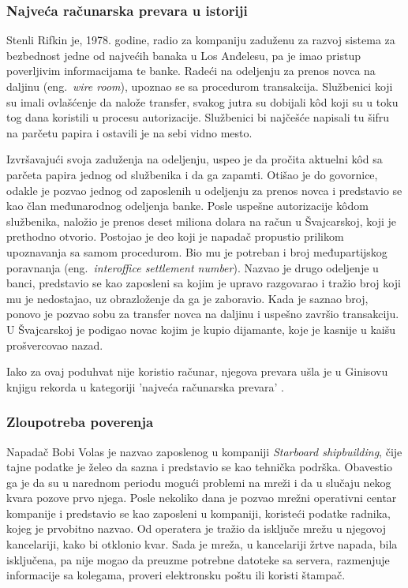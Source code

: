 \documentclass[a4paper]{article}
\begin{document}
\subsubsection{Najveća računarska prevara u istoriji}
\label{hack_za_ginisa}

Stenli Rifkin je, 1978. godine, radio za kompaniju 
zaduženu za razvoj sistema za bezbednost jedne od 
najvećih banaka u Los Anđelesu, pa je imao pristup 
poverljivim informacijama te banke. Radeći na 
odeljenju za prenos novca na daljinu (eng.~{\em wire 
room}), upoznao se sa procedurom transakcija. 
Službenici koji su imali ovlašćenje da nalože 
transfer, svakog jutra su dobijali kôd koji su u toku 
tog dana koristili u procesu autorizacije. Službenici 
bi najčešće napisali tu šifru na parčetu papira i 
ostavili je na sebi vidno mesto. 

Izvršavajući svoja zaduženja na odeljenju, uspeo je da pročita aktuelni kôd sa parčeta papira jednog od službenika i da ga zapamti. Otišao je do govornice, odakle je pozvao jednog od zaposlenih u odeljenju za prenos novca i predstavio se kao član međunarodnog odeljenja banke.
Posle uspešne autorizacije kôdom službenika, naložio je prenos deset miliona dolara na račun u Švajcarskoj, koji je prethodno otvorio. Postojao je deo koji je napadač propustio prilikom upoznavanja sa samom procedurom. Bio mu je potreban i broj međupartijskog poravnanja (eng.~{\em interoffice settlement number}). Nazvao je drugo odeljenje u banci, predstavio se kao zaposleni sa kojim je upravo razgovarao i tražio broj koji mu je nedostajao, uz obrazloženje da ga je zaboravio. Kada je saznao broj, ponovo je pozvao sobu za transfer novca na daljinu i uspešno završio transakciju. U Švajcarskoj je podigao novac kojim je kupio dijamante, koje je kasnije u kaišu prošvercovao nazad. 

Iako za ovaj poduhvat nije koristio računar, njegova prevara ušla je u Ginisovu knjigu rekorda u kategoriji 'najveća računarska prevara' \cite{deception}.

\subsubsection{Zloupotreba poverenja}
\label{pomoc_neprijatelja}

Napadač Bobi Volas je nazvao zaposlenog u kompaniji 
\textit{Starboard shipbuilding}, čije tajne podatke je želeo da sazna i predstavio se kao tehnička podrška. Obavestio ga je da su u narednom periodu mogući problemi na mreži i da u slučaju nekog kvara pozove prvo njega. Posle nekoliko dana je pozvao mrežni operativni centar kompanije i predstavio se kao zaposleni u kompaniji, koristeći podatke radnika, kojeg je prvobitno nazvao. Od operatera je tražio da isključe mrežu u njegovoj kancelariji, kako bi otklonio kvar. Sada je mreža, u kancelariji žrtve napada, bila isključena, pa nije mogao da preuzme potrebne datoteke sa servera, razmenjuje informacije sa kolegama, proveri elektronsku poštu ili koristi štampač.
\end{document}
